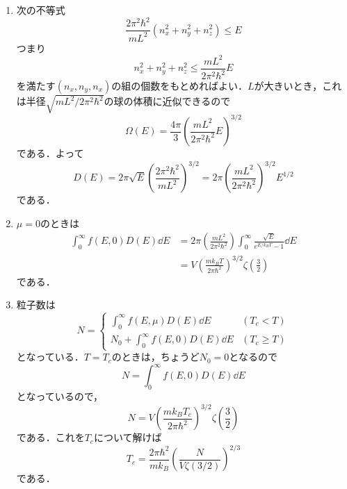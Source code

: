 \documentclass[a4paper,pdflatex,ja=standard]{bxjsarticle}
\begin{document}
\begin{enumerate}
  \item 
  次の不等式
  \begin{equation}
    \frac{2\pi^2\hbar^2}{mL^2}
    \left( n_{x}^2+n_{y}^2+n_{z}^2 \right)
    \leq
    E
  \end{equation}
  つまり
  \begin{equation}
    n_{x}^2+n_{y}^2+n_{z}^2
    \leq
    \frac{mL^2}{2\pi^2\hbar^2}
    E
  \end{equation}
  を満たす$(n_{x},n_{y},n_{x})$の組の個数をもとめればよい．$L$が大きいとき，これは半径$\sqrt{mL^2/2\pi^2\hbar^2}$の球の体積に近似できるので
  \begin{equation}
    \Omega(E)
    =
    \frac{4\pi}{3}
    \left(  
      \frac{mL^2}{2\pi^2\hbar^2}
      E
    \right)^{3/2}
  \end{equation}
  である．よって
  \begin{equation}
    D(E)
    =
    2\pi\sqrt{E}
    \left(  \frac{2\pi^2\hbar^2}{mL^2}  \right)^{3/2}
    =
    2\pi
    \left(  
      \frac{mL^2}{2\pi^2\hbar^2}
    \right)^{3/2}
    E^{1/2}
    \label{state}
  \end{equation}
  である．

  \item 
  $\mu=0$のときは
  \begin{align}
    \int_{0}^{\infty}f(E,0)D(E)\dd E
    &=    
    2\pi\left( \frac{mL^2}{2\pi^2\hbar^2} \right)
    \int_{0}^{\infty}
    \frac{\sqrt{E}}{e^{E/k_BT}-1}
    \dd E
    \nonumber
    \\
    &=
    V
    \left(  
      \frac{mk_BT}{2\pi\hbar^2}
    \right)^{3/2}
    \zeta\left( \frac{3}{2} \right)
    \label{ans2.4}
  \end{align}
  である．

  \item 
  粒子数は
  \begin{equation}
    N
    =
    \left\{\begin{alignedat}{1}
      \int_{0}^{\infty}f(E,\mu)D(E)\dd E
      &
      (T_{c}<T)
      \\
      N_{0}+\int_{0}^{\infty}f(E,0)D(E)\dd E
      &
      (T_{c}\geq T)
    \end{alignedat}\right.
  \end{equation}
  となっている．$T=T_c$のときは，ちょうど$N_{0}=0$となるので
  \begin{equation}
    N
    =
    \int_{0}^{\infty}f(E,0)D(E)\dd E
  \end{equation}
  となっているので，
  \begin{equation}
    N
    =
    V
    \left(  
      \frac{mk_BT_c}{2\pi\hbar^2}
    \right)^{3/2}
    \zeta\left( \frac{3}{2} \right)
    \label{number_critical}
  \end{equation}
  である．これを$T_{c}$について解けば
  \begin{equation}
    T_{c}
    =
    \frac{2\pi\hbar^2}{mk_B}
    \left(  
      \frac{N}{V\zeta(3/2)}
    \right)^{2/3}
  \end{equation}
  である．


\end{enumerate}
\end{document}
